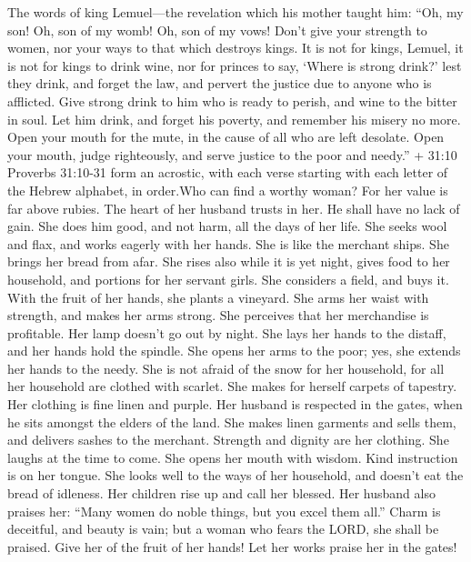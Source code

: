  The words of king Lemuel---the revelation which his mother
taught him:  ``Oh, my son! Oh, son of my womb! Oh, son of my
vows!  Don't give your strength to women, nor your ways to
that which destroys kings.  It is not for kings, Lemuel, it
is not for kings to drink wine, nor for princes to say, `Where is strong
drink?'  lest they drink, and forget the law, and pervert
the justice due to anyone who is afflicted.  Give strong
drink to him who is ready to perish, and wine to the bitter in soul.
 Let him drink, and forget his poverty, and remember his
misery no more.  Open your mouth for the mute, in the cause
of all who are left desolate.  Open your mouth, judge
righteously, and serve justice to the poor and needy.''  +
31:10 Proverbs 31:10-31 form an acrostic, with each verse starting with
each letter of the Hebrew alphabet, in order.Who can find a worthy
woman? For her value is far above rubies.  The heart of her
husband trusts in her. He shall have no lack of gain.  She
does him good, and not harm, all the days of her life.  She
seeks wool and flax, and works eagerly with her hands.  She
is like the merchant ships. She brings her bread from afar.
 She rises also while it is yet night, gives food to her
household, and portions for her servant girls.  She
considers a field, and buys it. With the fruit of her hands, she plants
a vineyard.  She arms her waist with strength, and makes
her arms strong.  She perceives that her merchandise is
profitable. Her lamp doesn't go out by night.  She lays her
hands to the distaff, and her hands hold the spindle.  She
opens her arms to the poor; yes, she extends her hands to the needy.
 She is not afraid of the snow for her household, for all
her household are clothed with scarlet.  She makes for
herself carpets of tapestry. Her clothing is fine linen and purple.
 Her husband is respected in the gates, when he sits
amongst the elders of the land.  She makes linen garments
and sells them, and delivers sashes to the merchant. 
Strength and dignity are her clothing. She laughs at the time to come.
 She opens her mouth with wisdom. Kind instruction is on
her tongue.  She looks well to the ways of her household,
and doesn't eat the bread of idleness.  Her children rise
up and call her blessed. Her husband also praises her: 
``Many women do noble things, but you excel them all.'' 
Charm is deceitful, and beauty is vain; but a woman who fears the LORD,
she shall be praised.  Give her of the fruit of her hands!
Let her works praise her in the gates!
